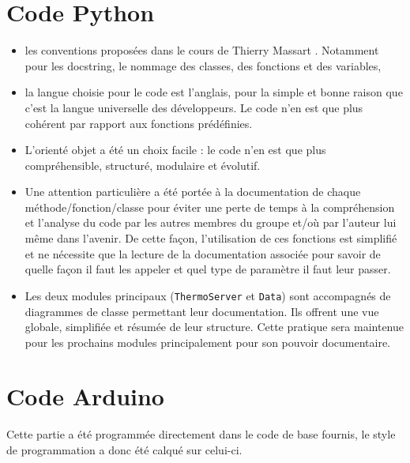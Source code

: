 \documentclass[11pt,a4paper,11pt]{report}
\begin{document}
\section{Code Python}
\begin{itemize}
\item les conventions proposées dans le cours de Thierry Massart \cite{massart}. Notamment pour les docstring, le nommage des classes, des fonctions et des variables,
\item la langue choisie pour le code est l'anglais, pour la simple et bonne raison que c'est la langue universelle des développeurs. Le code n'en est que plus cohérent par rapport aux fonctions prédéfinies.
\item L'orienté objet a été un choix facile : le code n'en est que plus compréhensible, structuré, modulaire et évolutif. 
\item Une attention particulière a été portée à la documentation de chaque méthode/fonction/classe pour éviter une perte de temps à la compréhension et l'analyse du code par les autres membres du groupe et/où par l'auteur lui même dans l'avenir. De cette façon, l'utilisation de ces fonctions est simplifié et ne nécessite que la lecture de la documentation associée pour savoir de quelle façon il faut les appeler et quel type de paramètre il faut leur passer.
\item Les deux modules principaux (\texttt{ThermoServer} et \texttt{Data}) sont accompagnés de diagrammes de classe permettant leur documentation. Ils offrent une vue globale, simplifiée et résumée de leur structure. Cette pratique sera maintenue pour les prochains modules principalement pour son pouvoir documentaire.
\end{itemize}

\section{Code Arduino}

Cette partie a été programmée directement dans le code de base fournis, le style de programmation a donc été calqué sur celui-ci.



\newpage

\nocite{int1}
\nocite{int2}
\nocite{int4}
\nocite{int5}
\nocite{int6}
\nocite{int7}
\nocite{int8}
\nocite{ar1}
\nocite{ar2}
\nocite{ar3}
\nocite{ar4}
\nocite{wil1}
\nocite{wil2}
\nocite{wil3}
\nocite{wil4}
\nocite{wil5}
\nocite{s1}
\nocite{s2}


 
\end{document}
